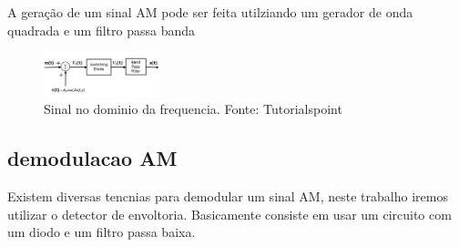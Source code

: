 A geração de um sinal AM pode ser feita utilziando um gerador de onda quadrada e um filtro passa banda

\begin{figure}[h]
\centering
\includegraphics[width=0.3\textwidth]{images/blocos_amd_con.png}
\caption{Sinal no dominio da frequencia. Fonte: Tutorialspoint} 
\label{fig:diagrama_blocos_am_convencional}
\end{figure}

\subsection{demodulacao AM}

Existem diversas tencnias para demodular um sinal AM, neste trabalho iremos utilizar o detector de envoltoria. Basicamente
consiste em usar um circuito com um diodo e um filtro passa baixa.




